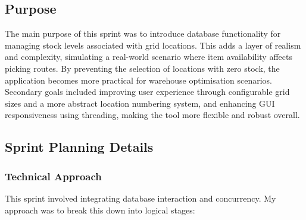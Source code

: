 \subsection{Purpose}

The main purpose of this sprint was to introduce database functionality for managing stock levels associated with grid locations. This adds a layer of realism and complexity, simulating a real-world scenario where item availability affects picking routes. By preventing the selection of locations with zero stock, the application becomes more practical for warehouse optimisation scenarios. Secondary goals included improving user experience through configurable grid sizes and a more abstract location numbering system, and enhancing GUI responsiveness using threading, making the tool more flexible and robust overall.

\clearpage
\subsection{Sprint Planning Details}

\subsubsection{Technical Approach}

This sprint involved integrating database interaction and concurrency. My approach was to break this down into logical stages:

